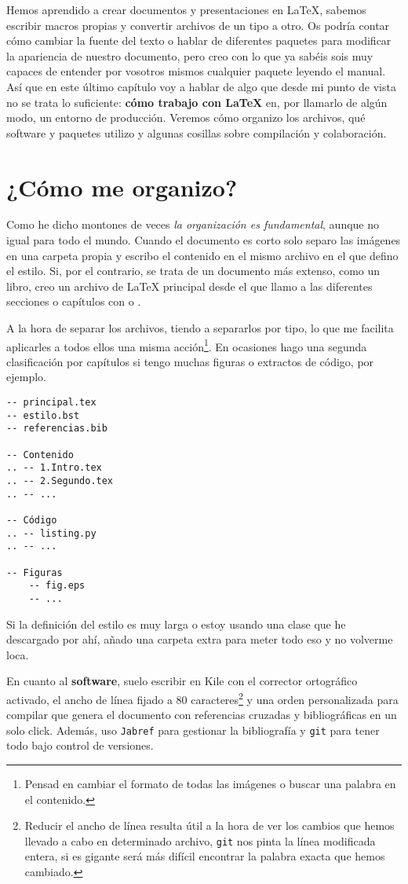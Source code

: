 Hemos aprendido a crear documentos y presentaciones en LaTeX, sabemos
escribir macros propias y convertir archivos de un tipo a otro. Os
podría contar cómo cambiar la fuente del texto o hablar de diferentes
paquetes para modificar la apariencia de nuestro documento, pero creo
con lo que ya sabéis sois muy capaces de entender por vosotros mismos
cualquier paquete leyendo el manual. Así que en este último capítulo voy
a hablar de algo que desde mi punto de vista no se trata lo suficiente:
\textbf{cómo trabajo con LaTeX} en, por llamarlo de algún modo, un
entorno de producción. Veremos cómo organizo los archivos, qué software
y paquetes utilizo y algunas cosillas sobre compilación y colaboración.

\section{¿Cómo me organizo?}

Como he dicho montones de veces \emph{la organización es fundamental},
aunque no igual para todo el mundo. Cuando el documento es corto solo
separo las imágenes en una carpeta propia y escribo el contenido en el
mismo archivo en el que defino el estilo. Si, por el contrario, se trata
de un documento más extenso, como un libro, creo un archivo de LaTeX
principal desde el que llamo a las diferentes secciones o capítulos con
\lstinline!! o \lstinline!!.

A la hora de separar los archivos, tiendo a separarlos por tipo, lo que
me facilita aplicarles a todos ellos una misma acción\footnote{Pensad en
  cambiar el formato de todas las imágenes o buscar una palabra en el
  contenido.}. En ocasiones hago una segunda clasificación por capítulos
si tengo muchas figuras o extractos de código, por ejemplo.

\begin{lstlisting}
-- principal.tex
-- estilo.bst
-- referencias.bib

-- Contenido
.. -- 1.Intro.tex
.. -- 2.Segundo.tex
.. -- ...

-- Código
.. -- listing.py
.. -- ...

-- Figuras
    -- fig.eps
    -- ...
\end{lstlisting}

Si la definición del estilo es muy larga o estoy usando una clase que he
descargado por ahí, añado una carpeta extra para meter todo eso y no
volverme loca.

En cuanto al \textbf{software}, suelo escribir en Kile con el corrector
ortográfico activado, el ancho de línea fijado a 80 caracteres\footnote{Reducir
  el ancho de línea resulta útil a la hora de ver los cambios que hemos
  llevado a cabo en determinado archivo, \lstinline!git! nos pinta la
  línea modificada entera, si es gigante será más difícil encontrar la
  palabra exacta que hemos cambiado.} y una orden personalizada para
compilar que genera el documento con referencias cruzadas y
bibliográficas en un solo click. Además, uso \lstinline!Jabref! para
gestionar la bibliografía y \lstinline!git! para tener todo bajo control
de versiones.

